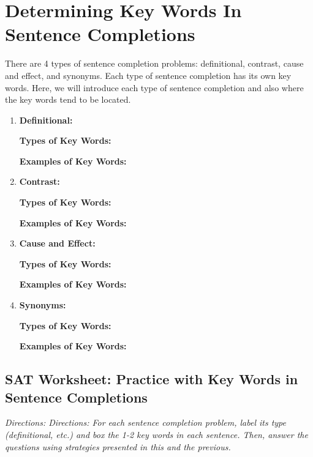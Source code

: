 \section{Determining Key Words In Sentence Completions}

There are 4 types of sentence completion problems: definitional, contrast, cause and effect, and
synonyms. Each type of sentence completion has its own key words. Here, we will introduce each
type of sentence completion and also where the key words tend to be located.

\begin{enumerate}
\item \textbf{Definitional:}

\textbf{Types of Key Words:}

\textbf{Examples of Key Words:}

\item \textbf{Contrast:}

\textbf{Types of Key Words:}

\textbf{Examples of Key Words:}

\item \textbf{Cause and Effect:}

\textbf{Types of Key Words:}

\textbf{Examples of Key Words:}

\item \textbf{Synonyms:}

\textbf{Types of Key Words:}

\textbf{Examples of Key Words:}

\end{enumerate} 

\subsection{SAT Worksheet: Practice with Key Words in Sentence Completions}

\textit{Directions: Directions: For each sentence completion problem, label its type (definitional, etc.) and box the
1-2 key words in each sentence. Then, answer the questions using strategies presented in this and
the previous.}

